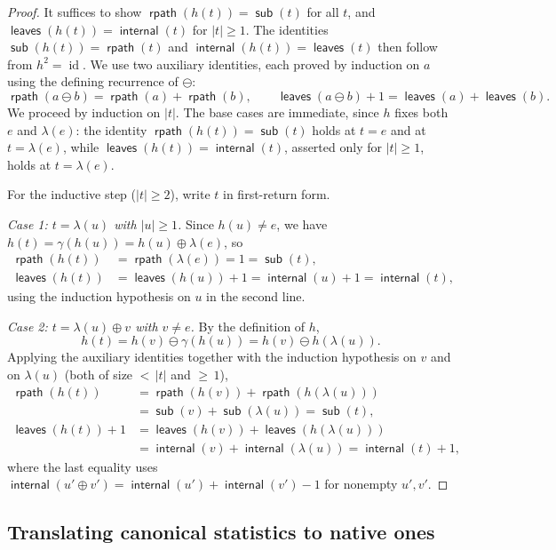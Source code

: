 \documentclass[a4paper,11pt]{article}
\theoremstyle{definition}
\DeclareMathOperator{\rpath}{\mathsf{rpath}}
\DeclareMathOperator{\leaves}{\mathsf{leaves}}
\DeclareMathOperator{\internal}{\mathsf{internal}}
\DeclareMathOperator{\subtrees}{\mathsf{sub}}
\begin{document}
\begin{proof}
It suffices to show $\rpath(h(t)) = \subtrees(t)$ for
all $t$, and $\leaves(h(t)) = \internal(t)$ for
$|t| \geq 1$. The identities $\subtrees(h(t)) = \rpath(t)$ and
$\internal(h(t)) = \leaves(t)$ then follow from
$h^2 = \operatorname{id}$. We use two auxiliary
identities, each proved by induction on $a$ using the
defining recurrence of $\ominus$:
\[
  \rpath(a \ominus b) = \rpath(a) + \rpath(b),
  \qquad
  \leaves(a \ominus b) + 1 = \leaves(a) + \leaves(b).
\]
We proceed by induction on $|t|$. The base cases are immediate, since $h$ fixes
both $e$ and $\lambda(e)$: the identity $\rpath(h(t)) = \subtrees(t)$ holds at
$t = e$ and at $t = \lambda(e)$, while $\leaves(h(t)) = \internal(t)$, asserted
only for $|t| \geq 1$, holds at $t = \lambda(e)$.

For the inductive step ($|t| \geq 2$), write $t$ in
first-return form.

\emph{Case 1: $t = \lambda(u)$ with $|u| \geq 1$.}
Since $h(u) \neq e$, we have
$h(t) = \gamma(h(u)) = h(u) \oplus \lambda(e)$, so
\begin{align*}
  \rpath(h(t))
    &= \rpath(\lambda(e)) = 1 = \subtrees(t), \\
  \leaves(h(t))
    &= \leaves(h(u)) + 1
    = \internal(u) + 1 = \internal(t),
\end{align*}
using the induction hypothesis on $u$ in the second
line.

\emph{Case 2: $t = \lambda(u) \oplus v$ with $v \neq e$.}
By the definition of $h$,
\[
  h(t) = h(v) \ominus \gamma(h(u))
       = h(v) \ominus h(\lambda(u)).
\]
Applying the auxiliary identities together with the
induction hypothesis on $v$ and on $\lambda(u)$ (both
of size ${<}\,|t|$ and ${\geq}\,1$),
\begin{align*}
  \rpath(h(t))
    &= \rpath(h(v)) + \rpath(h(\lambda(u))) \\
    &= \subtrees(v) + \subtrees(\lambda(u))
    = \subtrees(t), \\
  \leaves(h(t)) + 1
    &= \leaves(h(v)) + \leaves(h(\lambda(u))) \\
    &= \internal(v) + \internal(\lambda(u))
    = \internal(t) + 1,
\end{align*}
where the last equality uses
$\internal(u' \oplus v') = \internal(u') + \internal(v') - 1$
for nonempty $u', v'$.
\end{proof}

\subsection{Translating canonical statistics to native
  ones}\label{sec:dictionary}
\end{document}

